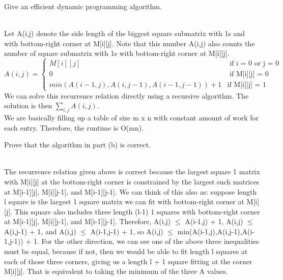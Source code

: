 \documentclass[solutionorbox,answers]{exam}
\begin{document}
\begin{questions}
\begin{parts}
  \item Give an efficient dynamic programming algorithm.
  \begin{solutionbox}{} \vspace{1em} \\
       Let A(i,j) denote the side length of the biggest square submatrix with 1s and with bottom-right corner at M[i][j]. Note that this number A(i,j) also counts the number of square submatrix with 1s with bottom-right corner at M[i][j].\\
       \begin{equation*}
        A(i,j) =
        \begin{cases}
            M[i][j] & \text{ if i = 0 or j = 0}\\ 
            0 & \text{ if M[i][j] = 0}\\
            min(A(i-1,j), A(i,j-1), A(i-1, j-1)) + 1 & \text{if M[i][j] = 1}
        \end{cases}
    \end{equation*}
    We can solve this recurrence relation directly using a recursive algorithm. The solution is then $\sum_{i,j} A(i,j)$.\\
    We are basically filling up a table of size m x n with constant amount of work for each entry. Therefore, the runtime is O(mn).
  \end{solutionbox}
 \newpage 
  \item Prove that the algorithm in part (b) is correct.
  \begin{solutionbox}{} \vspace{1em} \\
  The recurrence relation given above is correct because the largest square 1 matrix with M[i][j] at the bottom-right corner is constrained by the largest such matrices at M[i-1][j], M[i][j-1], and M[i-1][j-1]. We can think of this also as: suppose length l square is the largest 1 square matrix we can fit with bottom-right corner at M[i][j]. This square also includes three length (l-1) 1 squares with bottom-right corner at M[i-1][j], M[i][j-1], and M[i-1][j-1]. Therefore, A(i,j) $\leq$ A(i-1,j) + 1, A(i,j) $\leq$ A(i,j-1) + 1, and A(i,j) $\leq$ A(i-1,j-1) + 1, so A(i,j) $\leq$ min(A(i-1,j),A(i,j-1),A(i-1,j-1)) + 1. For the other direction, we can see one of the above three inequalities must be equal, because if not, then we would be able to fit length l squares at each of those three corners, giving us a length l + 1 square fitting at the corner M[i][j]. That is equivalent to taking the minimum of the three A values. 
  \end{solutionbox}


\end{parts}
\end{questions}
\end{document}
